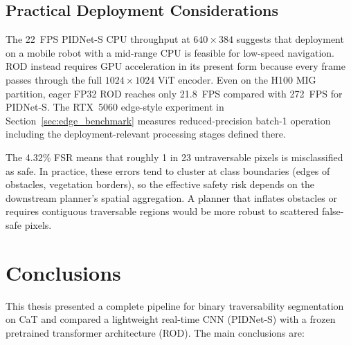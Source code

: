 \documentclass[12pt,a4paper]{report}
\begin{document}
\section{Practical Deployment Considerations}

The 22~FPS PIDNet-S CPU throughput at $640\times384$ suggests that deployment
on a mobile robot with a mid-range CPU is feasible for low-speed navigation.
ROD instead requires GPU acceleration in its present form because every frame
passes through the full $1024\times1024$ ViT encoder. Even on the H100 MIG
partition, eager FP32 ROD reaches only 21.8~FPS compared with 272~FPS for
PIDNet-S. The RTX~5060 edge-style experiment in
Section~\ref{sec:edge_benchmark} measures reduced-precision batch-1 operation
including the deployment-relevant processing stages defined there.

The 4.32\% FSR means that roughly 1 in 23 untraversable pixels is misclassified as safe.
In practice, these errors tend to cluster at class boundaries (edges of obstacles, vegetation borders), so the effective safety risk depends on the downstream planner's spatial aggregation.
A planner that inflates obstacles or requires contiguous traversable regions would be more robust to scattered false-safe pixels.


\chapter{Conclusions}
\label{sec:conclusions}

This thesis presented a complete pipeline for binary traversability segmentation
on CaT and compared a lightweight real-time CNN (PIDNet-S) with a frozen
pretrained transformer architecture (ROD).
The main conclusions are:
\end{document}
